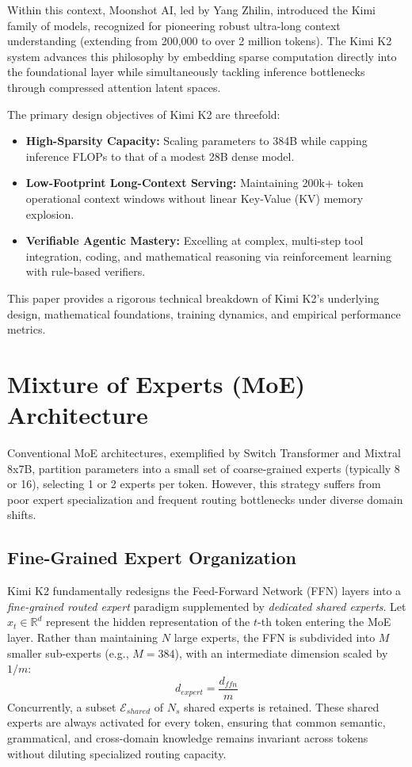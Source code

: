 \documentclass[conference]{IEEEtran}
\begin{document}
Within this context, Moonshot AI, led by Yang Zhilin, introduced the Kimi family of models, recognized for pioneering robust ultra-long context understanding (extending from 200,000 to over 2 million tokens). The Kimi K2 system advances this philosophy by embedding sparse computation directly into the foundational layer while simultaneously tackling inference bottlenecks through compressed attention latent spaces.

The primary design objectives of Kimi K2 are threefold:
\begin{itemize}
    \item \textbf{High-Sparsity Capacity:} Scaling parameters to 384B while capping inference FLOPs to that of a modest 28B dense model.
    \item \textbf{Low-Footprint Long-Context Serving:} Maintaining 200k+ token operational context windows without linear Key-Value (KV) memory explosion.
    \item \textbf{Verifiable Agentic Mastery:} Excelling at complex, multi-step tool integration, coding, and mathematical reasoning via reinforcement learning with rule-based verifiers.
\end{itemize}

This paper provides a rigorous technical breakdown of Kimi K2's underlying design, mathematical foundations, training dynamics, and empirical performance metrics.

\section{Mixture of Experts (MoE) Architecture}
Conventional MoE architectures, exemplified by Switch Transformer \cite{fedus2022switch} and Mixtral 8x7B, partition parameters into a small set of coarse-grained experts (typically 8 or 16), selecting 1 or 2 experts per token. However, this strategy suffers from poor expert specialization and frequent routing bottlenecks under diverse domain shifts.

\subsection{Fine-Grained Expert Organization}
Kimi K2 fundamentally redesigns the Feed-Forward Network (FFN) layers into a \textit{fine-grained routed expert} paradigm supplemented by \textit{dedicated shared experts}. Let $x_t \in \mathbb{R}^d$ represent the hidden representation of the $t$-th token entering the MoE layer. Rather than maintaining $N$ large experts, the FFN is subdivided into $M$ smaller sub-experts (e.g., $M = 384$), with an intermediate dimension scaled by $1/m$:
\begin{equation}
d_{expert} = \frac{d_{ffn}}{m}
\end{equation}
Concurrently, a subset $\mathcal{E}_{shared}$ of $N_s$ shared experts is retained. These shared experts are always activated for every token, ensuring that common semantic, grammatical, and cross-domain knowledge remains invariant across tokens without diluting specialized routing capacity.
\end{document}
